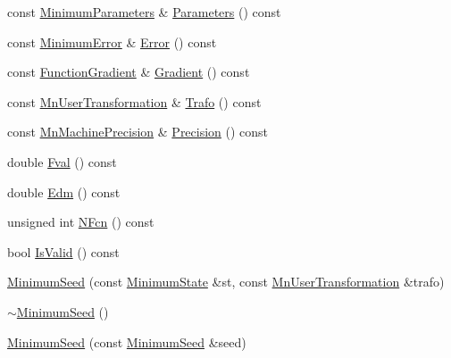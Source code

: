 \begin{DoxyCompactItemize}
\item 
const \mbox{\hyperlink{classROOT_1_1Minuit2_1_1MinimumParameters}{Minimum\+Parameters}} \& \mbox{\hyperlink{classROOT_1_1Minuit2_1_1MinimumSeed_a994d60b61e96fefc68cbccab8f82794d}{Parameters}} () const
\item 
const \mbox{\hyperlink{classROOT_1_1Minuit2_1_1MinimumError}{Minimum\+Error}} \& \mbox{\hyperlink{classROOT_1_1Minuit2_1_1MinimumSeed_a19cc15c1feb45267a1a8b2cdb4f25ac2}{Error}} () const
\item 
const \mbox{\hyperlink{classROOT_1_1Minuit2_1_1FunctionGradient}{Function\+Gradient}} \& \mbox{\hyperlink{classROOT_1_1Minuit2_1_1MinimumSeed_acde7a067ded2fb87a3dba51ba82a1afd}{Gradient}} () const
\item 
const \mbox{\hyperlink{classROOT_1_1Minuit2_1_1MnUserTransformation}{Mn\+User\+Transformation}} \& \mbox{\hyperlink{classROOT_1_1Minuit2_1_1MinimumSeed_a140162d25593e6675f6f521fc9d5fc84}{Trafo}} () const
\item 
const \mbox{\hyperlink{classROOT_1_1Minuit2_1_1MnMachinePrecision}{Mn\+Machine\+Precision}} \& \mbox{\hyperlink{classROOT_1_1Minuit2_1_1MinimumSeed_a0cc83616e61f2d3552cedf34ed09e361}{Precision}} () const
\item 
double \mbox{\hyperlink{classROOT_1_1Minuit2_1_1MinimumSeed_a55c498b499c84f1a693729aa269db9aa}{Fval}} () const
\item 
double \mbox{\hyperlink{classROOT_1_1Minuit2_1_1MinimumSeed_ab378accd110c0313557d3e916e2a9282}{Edm}} () const
\item 
unsigned int \mbox{\hyperlink{classROOT_1_1Minuit2_1_1MinimumSeed_a095d402b58fea6b0b06323b079974bf3}{N\+Fcn}} () const
\item 
bool \mbox{\hyperlink{classROOT_1_1Minuit2_1_1MinimumSeed_a5d9ffd4dbd68f6cfcfef821844e70158}{Is\+Valid}} () const
\item 
\mbox{\hyperlink{classROOT_1_1Minuit2_1_1MinimumSeed_a0d3070cfaa1be8ce9e9e64f39a30b875}{Minimum\+Seed}} (const \mbox{\hyperlink{classROOT_1_1Minuit2_1_1MinimumState}{Minimum\+State}} \&st, const \mbox{\hyperlink{classROOT_1_1Minuit2_1_1MnUserTransformation}{Mn\+User\+Transformation}} \&trafo)
\item 
\mbox{\hyperlink{classROOT_1_1Minuit2_1_1MinimumSeed_a99b95b10842f335d10bf7293f7d91b92}{$\sim$\+Minimum\+Seed}} ()
\item 
\mbox{\hyperlink{classROOT_1_1Minuit2_1_1MinimumSeed_a720f1ac742c7c9c8425bad7b4dc7dd12}{Minimum\+Seed}} (const \mbox{\hyperlink{classROOT_1_1Minuit2_1_1MinimumSeed}{Minimum\+Seed}} \&seed)

\end{DoxyCompactItemize}
